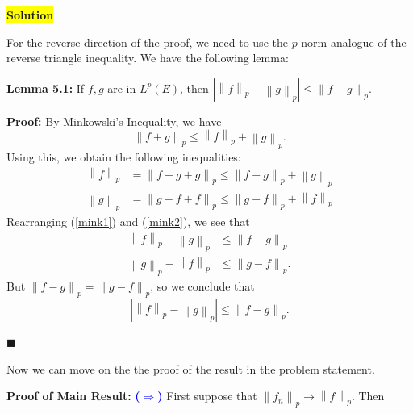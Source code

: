 \documentclass[12pt]{article}
\newcommand\norm[1]{\left\lVert#1\right\rVert}
\newcommand{\mybox}{%
    \collectbox{%
        \setlength{\fboxsep}{2pt}%
        \fbox{\BOXCONTENT}%
    }%
}
\begin{document}
\vspace{5mm}

\noindent\mybox{\colorbox{yellow}{\textbf{Solution}}}\hspace{3mm}\hrulefill

\noindent For the reverse direction of the proof, we need to use the $p$-norm analogue of the reverse triangle inequality. We have the following lemma:

\vspace{5mm}

\noindent\textbf{Lemma 5.1:} If $f,g$ are in $L^p(E)$, then $\left|\norm{f}_p-\norm{g}_p\right| \leq \norm{f-g}_p.$

\vspace{5mm}

\noindent\textbf{Proof:} By Minkowski's Inequality, we have $$\norm{f+g}_p \leq \norm{f}_p + \norm{g}_p.$$ Using this, we obtain the following inequalities: 
\begin{align}
    \norm{f}_p &= \norm{f-g+g}_p \leq \norm{f-g}_p + \norm{g}_p \label{mink1}\\ 
    \norm{g}_p &= \norm{g-f+f}_p \leq \norm{g-f}_p + \norm{f}_p \label{mink2}
\end{align}
Rearranging (\ref{mink1}) and (\ref{mink2}), we see that
\begin{align}
    \norm{f}_p - \norm{g}_p &\leq \norm{f-g}_p \\
    \norm{g}_p - \norm{f}_p &\leq \norm{g-f}_p.
\end{align}
But $\norm{f-g}_p=\norm{g-f}_p$, so we conclude that $$\left|\norm{f}_p-\norm{g}_p\right| \leq \norm{f-g}_p.$$

\hfill$\blacksquare$

\noindent Now we can move on the the proof of the result in the problem statement.

\pagebreak

\noindent\textbf{Proof of Main Result:} \textcolor{blue}{\textbf{($\Rightarrow$)}} First suppose that $\norm{f_n}_p\rightarrow \norm{f}_p$. Then 
\end{document}

